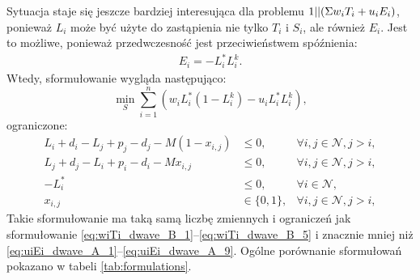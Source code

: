 Sytuacja staje się jeszcze bardziej interesująca dla problemu $1||(\Sigma{}w_i T_i+u_i E_i)$, ponieważ $L_i$ może być użyte do zastąpienia nie tylko $T_i$ i $S_i$, ale również $E_i$. Jest to możliwe, ponieważ przedwczesność jest przeciwieństwem spóźnienia:
%
\begin{align}
    E_i = - L_i^* L_i^k .
\end{align}
%
Wtedy, sformułowanie wygląda następująco:
%
\begin{equation}\label{eq:uiEi_dwave_B_1}
    \min_S \sum_{i=1}^n (w_i L_i^* (1 - L_i^k) - u_i L_i^* L_i^k ),
\end{equation}
%
ograniczone:
%
\begin{align}
    L_i + d_i - L_j + p_j - d_j - M(1-x_{i,j}) & \leq{} 0, & \forall{}i,j\in{}\mathcal{N},j>i, \label{eq:uiEi_dwave_B_2} \\
    L_j + d_j - L_i + p_i - d_i - Mx_{i,j} & \leq{} 0, & \forall{}i,j\in{}\mathcal{N},j>i, \label{eq:uiEi_dwave_B_3} \\
    -L_i^* & \leq{} 0, & \forall{}i\in{}\mathcal{N}, \label{eq:uiEi_dwave_B_4} \\
    x_{i,j} & \in \{0,1\}, & \forall{}i,j\in{}\mathcal{N},j>i, \label{eq:uiEi_dwave_B_5}
\end{align}
%
Takie sformułowanie ma taką samą liczbę zmiennych i ograniczeń jak sformułowanie \eqref{eq:wiTi_dwave_B_1}--\eqref{eq:wiTi_dwave_B_5} i znacznie mniej niż \eqref{eq:uiEi_dwave_A_1}--\eqref{eq:uiEi_dwave_A_9}. Ogólne porównanie sformułowań pokazano w tabeli \ref{tab:formulations}.

